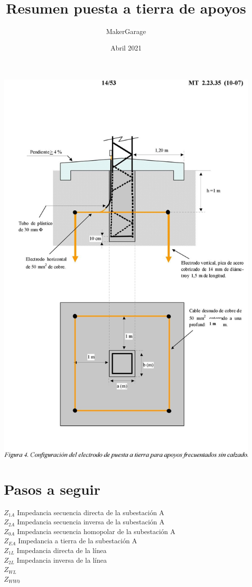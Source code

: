 \documentclass[10pt,a4paper]{article}
\title{Resumen puesta a tierra de apoyos}
\author{MakerGarage}
\date{Abril 2021}
\begin{document}
\maketitle
\begin{center}
    \includegraphics[trim = {0cm 1cm 0cm 1cm},clip,scale = 1.6]{assets/page_15.jpg}
\end{center}
\newpage

\section{Pasos a seguir}
$Z_{1A}$ Impedancia secuencia directa de la subestación A \\
$Z_{2A}$ Impedancia secuencia inversa de la subestación A \\
$Z_{0A}$ Impedancia secuencia homopolar de la subestación A \\
$Z_{EA}$ Impedancia a tierra de la subestación A \\
$Z_{1L}$ Impedancia directa de la línea \\
$Z_{2L}$ Impedancia inversa de la línea \\
$Z_{WL}$  \\
$Z_{WW0}$ \\
\end{document}
